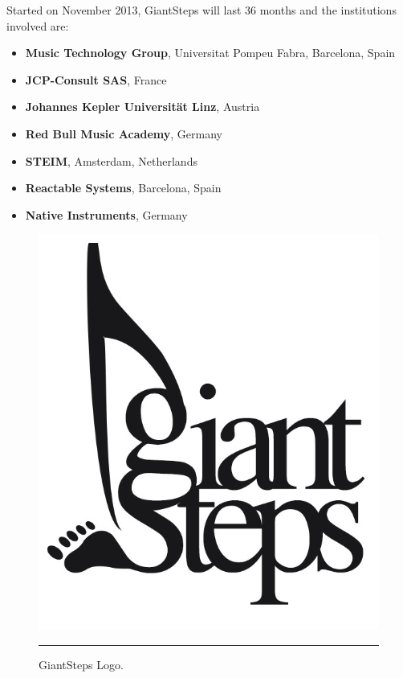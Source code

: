 Started on November 2013, GiantSteps will last 36 months and the institutions involved are:
\begin{itemize}
\item \textbf{Music Technology Group}, Universitat Pompeu Fabra, Barcelona, Spain
\item \textbf{JCP-Consult SAS}, France
\item \textbf{Johannes Kepler Universität Linz}, Austria
\item \textbf{Red Bull Music Academy}, Germany
\item \textbf{STEIM}, Amsterdam, Netherlands
\item \textbf{Reactable Systems}, Barcelona, Spain
\item \textbf{Native Instruments}, Germany
\end{itemize}

\begin{figure}[htbp]
  \centering
    \includegraphics{Figures/giantsteps.png}
    \rule{35em}{0.5pt}
  \caption[GiantSteps]{GiantSteps Logo.}
  \label{fig:GiantSteps}
\end{figure}


